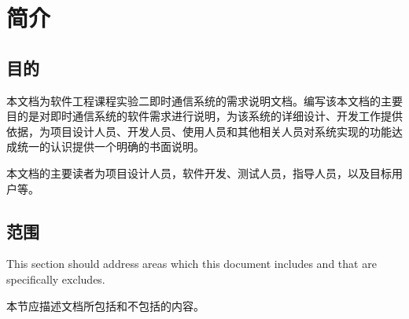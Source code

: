 \chapter{简介}
\section{目的}


本文档为软件工程课程实验二即时通信系统的需求说明文档。编写该本文档的主要目的是对即时通信系统的软件需求进行说明，为该系统的详细设计、开发工作提供依据，为项目设计人员、开发人员、使用人员和其他相关人员对系统实现的功能达成统一的认识提供一个明确的书面说明。

本文档的主要读者为项目设计人员，软件开发、测试人员，指导人员，以及目标用户等。

\section{范围}
This section should address areas which this document includes and that are specifically excludes. 

本节应描述文档所包括和不包括的内容。
